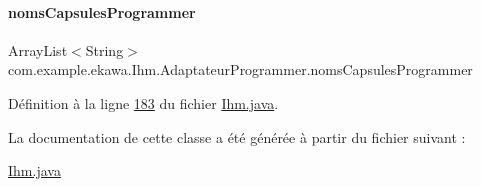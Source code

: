\paragraph{\texorpdfstring{noms\+Capsules\+Programmer}{nomsCapsulesProgrammer}}
{\footnotesize\ttfamily Array\+List$<$String$>$ com.\+example.\+ekawa.\+Ihm.\+Adaptateur\+Programmer.\+noms\+Capsules\+Programmer\hspace{0.3cm}{\ttfamily [private]}}



Définition à la ligne \hyperlink{_ihm_8java_source_l00183}{183} du fichier \hyperlink{_ihm_8java_source}{Ihm.\+java}.



La documentation de cette classe a été générée à partir du fichier suivant \+:\begin{DoxyCompactItemize}
\item 
\hyperlink{_ihm_8java}{Ihm.\+java}\end{DoxyCompactItemize}
